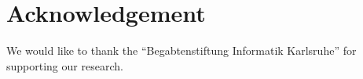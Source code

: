
\section{Acknowledgement}\label{sec:acknowledgement}

We would like to thank the \enquote{Begabtenstiftung Informatik Karlsruhe} for
 supporting our research.
